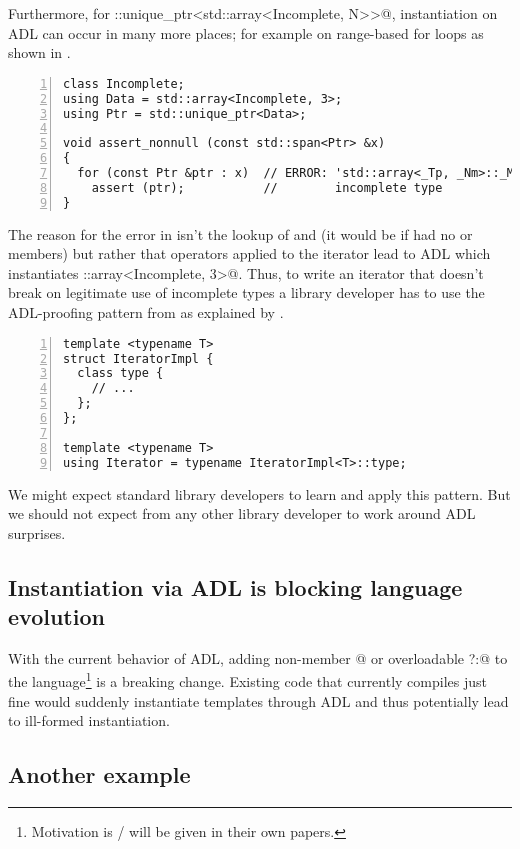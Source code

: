 Furthermore, for \codelst@std::unique_ptr<std::array<Incomplete, N>>@, instantiation on 
ADL can occur in many more places; for example on range-based for loops as shown in 
.
\begin{lstlisting}[style=Vc,numbers=left,float={hbtp},label=lst:iterating_uniqptr,caption={
Iteration over \code{std::span<std::unique_ptr<std::array<Incomplete, N>>>} is ill-formed
}]
class Incomplete;
using Data = std::array<Incomplete, 3>;
using Ptr = std::unique_ptr<Data>;

void assert_nonnull (const std::span<Ptr> &x)
{
  for (const Ptr &ptr : x)  // ERROR: 'std::array<_Tp, _Nm>::_M_elems' has
    assert (ptr);           //        incomplete type
}
\end{lstlisting}
The reason for the error in  isn't the lookup of  and 
 (it would be if  had no  or  members) but rather 
that operators applied to the iterator lead to ADL which instantiates 
\codelst@std::array<Incomplete, 3>@. Thus, to write an iterator that doesn't break on 
legitimate use of incomplete types a library developer has to use the ADL-proofing pattern 
from  as explained by \textcite{P2538R0}.
\begin{lstlisting}[style=Vc,numbers=left,float={hbtp},label=lst:adlproofediterator,caption={
ADL-proofed iterator type
}]
template <typename T>
struct IteratorImpl {
  class type {
    // ...
  };
};

template <typename T>
using Iterator = typename IteratorImpl<T>::type;
\end{lstlisting}
We might expect standard library developers to learn and apply this pattern. But we should 
not expect from any other \CC{} library developer to work around ADL surprises.

\subsection{Instantiation via ADL is blocking language evolution}
With the current behavior of ADL, adding non-member \codelst@operator[]@ or overloadable 
\codelst@operator?:@ to the language\footnote{Motivation is / will be given in their own 
papers.} is a breaking change. Existing code that currently compiles just fine would 
suddenly instantiate templates through ADL and thus potentially lead to ill-formed 
instantiation.

\subsection{Another example}

